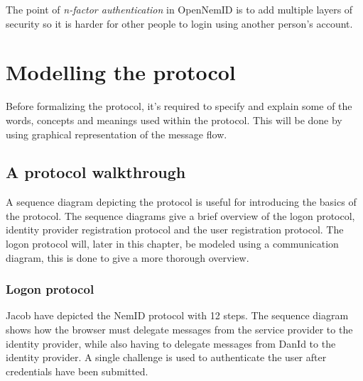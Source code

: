 \documentclass[twosided]{report}
\begin{document}
The point of \emph{n-factor authentication} in OpenNemID is to add multiple layers of security so it is harder for other people to login using another person's account.

\chapter{Modelling the protocol}
Before formalizing the protocol, it's required to specify and explain some of the words, concepts and meanings used within the protocol. This will be done by using graphical representation of the message flow.

\section{A protocol walkthrough}
A sequence diagram depicting the protocol is useful for introducing the basics of the protocol. The sequence diagrams give a brief overview of the logon protocol, identity provider registration protocol and the user registration protocol. The logon protocol will, later in this chapter, be modeled using a communication diagram, this is done to give a more thorough overview.

\subsection{Logon protocol}
Jacob have depicted the NemID protocol with 12 steps. The sequence diagram shows how the browser must delegate messages from the service provider to the identity provider, while also having to delegate messages from DanId to the identity provider. A single challenge is used to authenticate the user after credentials have been submitted.
\end{document}

